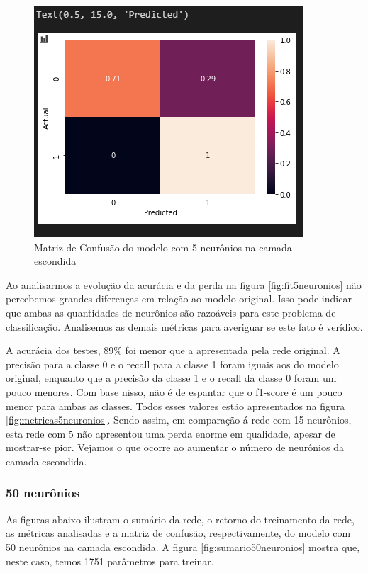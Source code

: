 \documentclass[12pt]{article}
\begin{document}
\begin{figure}[H]
	\centering
	\includegraphics[width=0.7\linewidth]{Imagens/5neuronios/confusao5neuronios}
	\caption{Matriz de Confusão do modelo com 5 neurônios na camada escondida}
	\label{fig:confusao5neuronios}
\end{figure}

Ao analisarmos a evolução da acurácia e da perda na figura \ref{fig:fit5neuronios} não percebemos grandes diferenças em relação ao modelo original. Isso pode indicar que ambas as quantidades de neurônios são razoáveis para este problema de classificação. Analisemos as demais métricas para averiguar se este fato é verídico.

A acurácia dos testes, 89\% foi menor que a apresentada pela rede original. A precisão para a classe 0 e o recall para a classe 1 foram iguais aos do modelo original, enquanto que a precisão da classe 1 e o recall da classe 0 foram um pouco menores. Com base nisso, não é de espantar que o f1-score é um pouco menor para ambas as classes. Todos esses valores estão apresentados na figura \ref{fig:metricas5neuronios}. Sendo assim, em comparação á rede com 15 neurônios, esta rede com 5 não apresentou uma perda enorme em qualidade, apesar de mostrar-se pior. Vejamos o que ocorre ao aumentar o número de neurônios da camada escondida.

\subsubsection{50 neurônios}

As figuras abaixo ilustram o sumário da rede, o retorno do treinamento da rede, as métricas analisadas e a matriz de confusão, respectivamente, do modelo com 50 neurônios na camada escondida. A figura \ref{fig:sumario50neuronios} mostra que, neste caso, temos 1751 parâmetros para treinar.
\end{document}
